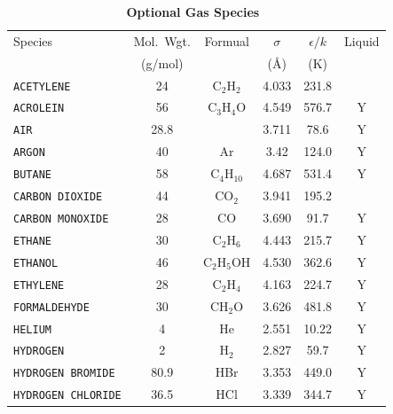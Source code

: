 \documentclass[11pt]{book}
\newcommand{\ct}{\tt\small}
\begin{document}
\begin{table}[ht]
\begin{center}
\caption[Optional Gas Species]{\bf Optional Gas Species~\cite{Reid:1}}
\label{tab:gasspecies}
\vspace{0.1in}
\begin{tabular}{|l|c|c|c|c|c|}
\hline
Species &   Mol.~Wgt.           & Formual          & $\sigma$ & $\epsilon/k$   & Liquid \\
        &   (g/mol)             &                  & (\AA)    & (K)            &        \\ \hline
\hline
{\ct ACETYLENE}          & 24   & C$_2$H$_2$       & 4.033    & 231.8           &        \\ \hline
{\ct ACROLEIN}           & 56   & C$_3$H$_4$O      & 4.549    & 576.7           &    Y   \\ \hline
{\ct AIR}                & 28.8 &                  & 3.711    & 78.6            &    Y   \\ \hline
{\ct ARGON}              & 40   & Ar               & 3.42     & 124.0           &    Y   \\ \hline
{\ct BUTANE}             & 58   & C$_4$H$_{10}$    & 4.687    & 531.4           &    Y   \\ \hline
{\ct CARBON DIOXIDE}     & 44   & CO$_2$           & 3.941    & 195.2           &        \\ \hline
{\ct CARBON MONOXIDE}    & 28   & CO               & 3.690    & 91.7            &    Y   \\ \hline
{\ct ETHANE}             & 30   & C$_2$H$_6$       & 4.443    & 215.7           &    Y   \\ \hline
{\ct ETHANOL}            & 46   & C$_2$H$_5$OH     & 4.530    & 362.6           &    Y   \\ \hline
{\ct ETHYLENE}           & 28   & C$_2$H$_4$ 	   & 4.163    & 224.7           &    Y   \\ \hline
{\ct FORMALDEHYDE}       & 30   & CH$_2$O          & 3.626    & 481.8           &    Y   \\ \hline
{\ct HELIUM}             & 4    & He               & 2.551    & 10.22           &    Y   \\ \hline
{\ct HYDROGEN}           & 2    & H$_2$            & 2.827    & 59.7            &    Y   \\ \hline
{\ct HYDROGEN BROMIDE}   & 80.9 & HBr              & 3.353    & 449.0           &    Y   \\ \hline
{\ct HYDROGEN CHLORIDE}  & 36.5 & HCl              & 3.339    & 344.7           &    Y   \\ \hline

\end{tabular}
\end{center}
\end{table}
\end{document}
